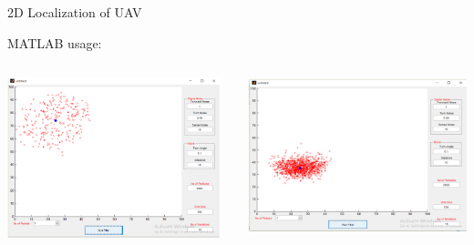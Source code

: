 
\begin{frame}{2D Localization of UAV}

    MATLAB usage:

    \vfill
    
    \begin{columns}
        \begin{column}{0.45\columnwidth}
            \includegraphics[width=0.97\textwidth]{figures/matlab3.png}
        \end{column}
        \hfill
        \begin{column}{0.45\columnwidth}
            \includegraphics[width=\textwidth]{figures/matlab4.png}
        \end{column}
    \end{columns}

\end{frame}